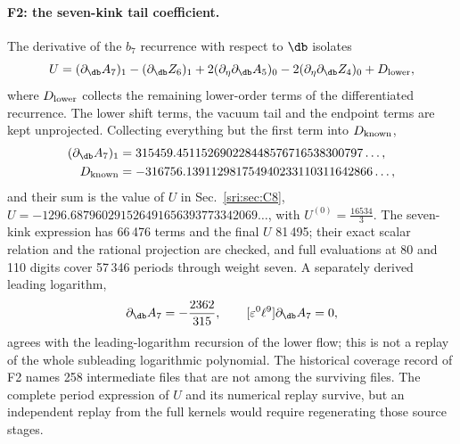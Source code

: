 \paragraph{F2: the seven-kink tail coefficient.} The derivative of the $b_7$ recurrence with respect to $\db$ isolates
\begin{equation}
 U=(\partial_{\db}A_7)_1-(\partial_{\db}Z_6)_1+2(\partial_\eta\partial_{\db}A_5)_0-2(\partial_\eta\partial_{\db}Z_4)_0
 +D_{\rm lower},
\end{equation}
where $D_{\rm lower}$ collects the remaining lower-order terms of the differentiated recurrence. The lower shift
terms, the vacuum tail and the endpoint terms are kept unprojected. Collecting everything but the first term into $D_{\rm known}$,
\begin{equation}
\begin{aligned}
 (\partial_{\db}A_7)_1&=315459.451152690228448576716538300797\ldots,\\
 D_{\rm known}&=-316756.139112981754940233110311642866\ldots,
\end{aligned}
\end{equation}
and their sum is the value of $U$ in Sec.~\ref{sri:sec:C8}, $U=-1296.687960291526491656393773342069\ldots$, with
$U^{(0)}=\frac{16534}{3}$. The seven-kink expression has 66\,476 terms and the final $U$ 81\,495; their exact scalar
relation and the rational projection are checked, and full evaluations at 80 and 110 digits cover 57\,346 periods
through weight seven. A separately derived leading logarithm,
\begin{equation}
 [\varepsilon^0\ell^8]\partial_{\db}A_7=-\frac{2362}{315},\qquad [\varepsilon^0\ell^9]\partial_{\db}A_7=0,
\end{equation}
agrees with the leading-logarithm recursion of the lower flow; this is not a replay of the whole subleading logarithmic
polynomial. The historical coverage record of F2 names 258 intermediate files that are not among the surviving files.
The complete period expression of $U$ and its numerical replay survive, but an independent replay from the full kernels
would require regenerating those source stages.

